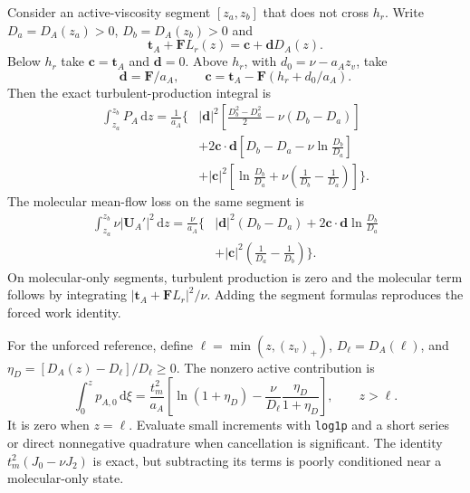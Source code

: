 \documentclass[11pt,a4paper]{article}
\numberwithin{equation}{section}
\newcommand{\dd}{\mathrm d}
\begin{document}
Consider an active-viscosity segment $[z_a,z_b]$ that does not cross
$h_r$. Write $D_a=D_A(z_a)>0$, $D_b=D_A(z_b)>0$ and
\begin{equation}
 \boldsymbol t_A+\boldsymbol F L_r(z)
 =\boldsymbol c+\boldsymbol d D_A(z).
\end{equation}
Below $h_r$ take $\boldsymbol c=\boldsymbol t_A$ and
$\boldsymbol d=0$. Above $h_r$, with
$d_0=\nu-a_Az_v$, take
\begin{equation}
 \boldsymbol d=\boldsymbol F/a_A,\qquad
 \boldsymbol c=\boldsymbol t_A-\boldsymbol F(h_r+d_0/a_A).
\end{equation}
Then the exact turbulent-production integral is
\begin{align}
 \int_{z_a}^{z_b}P_A\,\dd z
 =\frac1{a_A}\Bigg\{&
 |\boldsymbol d|^2
 \left[\frac{D_b^2-D_a^2}{2}-\nu(D_b-D_a)\right]\nonumber\\
 &+2\boldsymbol c\cdot\boldsymbol d
 \left[D_b-D_a-\nu\ln\frac{D_b}{D_a}\right]\nonumber\\
 &+|\boldsymbol c|^2
 \left[\ln\frac{D_b}{D_a}
 +\nu\left(\frac1{D_b}-\frac1{D_a}\right)\right]\Bigg\}.
 \label{app:forced-production}
\end{align}
The molecular mean-flow loss on the same segment is
\begin{align}
 \int_{z_a}^{z_b}\nu|\boldsymbol U_A'|^2\,\dd z
 =\frac{\nu}{a_A}\Bigg\{&
 |\boldsymbol d|^2(D_b-D_a)
 +2\boldsymbol c\cdot\boldsymbol d\ln\frac{D_b}{D_a}\nonumber\\
 &+|\boldsymbol c|^2\left(\frac1{D_a}-\frac1{D_b}\right)\Bigg\}.
 \label{app:forced-molecular}
\end{align}
On molecular-only segments, turbulent production is zero and the
molecular term follows by integrating
$|\boldsymbol t_A+\boldsymbol F L_r|^2/\nu$.
Adding the segment formulas reproduces the forced work identity.

For the unforced reference, define $\ell=\min(z,(z_v)_+)$,
$D_\ell=D_A(\ell)$, and $\eta_D=[D_A(z)-D_\ell]/D_\ell\ge0$.
The nonzero active contribution is
\begin{equation}
 \int_0^zp_{A,0}\,\dd\xi
 =\frac{t_m^2}{a_A}
 \left[\ln(1+\eta_D)
 -\frac{\nu}{D_\ell}\frac{\eta_D}{1+\eta_D}\right],
 \qquad z>\ell.
 \label{app:positive-production}
\end{equation}
It is zero when $z=\ell$. Evaluate small increments with
\texttt{log1p} and a short series or direct nonnegative quadrature
when cancellation is significant. The identity
$t_m^2(J_0-\nu J_2)$ is exact, but subtracting its terms is poorly
conditioned near a molecular-only state.
\end{document}
